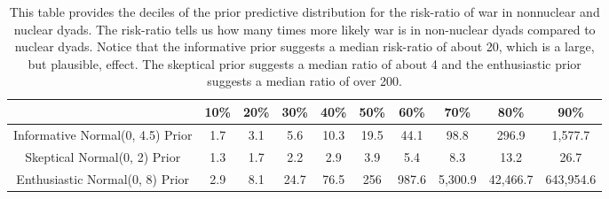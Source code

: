 \begin{table}[H]
\centering
{\scriptsize
\begin{tabular}{|cccccccccc|}
  \hline
 & 10\% & 20\% & 30\% & 40\% & 50\% & 60\% & 70\% & 80\% & 90\% \\ 
  \hline
Informative Normal(0, 4.5) Prior &       1.7 &       3.1 &       5.6 &      10.3 &      19.5 &      44.1 &      98.8 &     296.9 &   1,577.7 \\ 
  Skeptical Normal(0, 2) Prior &       1.3 &       1.7 &       2.2 &       2.9 &       3.9 &       5.4 &       8.3 &      13.2 &      26.7 \\ 
  Enthusiastic Normal(0, 8) Prior &       2.9 &       8.1 &      24.7 &      76.5 &       256 &     987.6 &   5,300.9 &  42,466.7 & 643,954.6 \\ 
   \hline
\end{tabular}
}
\caption{This table provides the deciles of the prior predictive distribution for the 
                  risk-ratio of war in nonnuclear and nuclear dyads. The risk-ratio
                  tells us how many times more likely war is in non-nuclear dyads compared 
                  to nuclear dyads. Notice that the informative prior suggests a median 
                  risk-ratio of about 20, which is a large, but plausible, effect. The skeptical prior suggests a median 
                  ratio of about 4 and the enthusiastic prior suggests a median ratio of over 
                  200.} 
\label{tab:bm-ppd-deciles}
\end{table}
